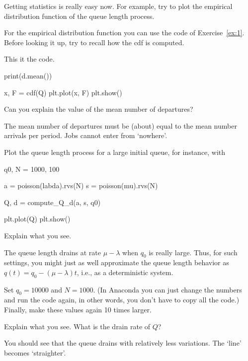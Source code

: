 \begin{exercise}
  Getting statistics is really easy now. For example,  try to plot the empirical distribution function of the queue length process.
  \begin{hint}
For  the empirical distribution function  you can use the code of Exercise~\ref{ex:1}. Before looking it up, try to recall how the cdf is computed.
  \end{hint}


  \begin{solution}
This it the code.    
  \begin{pyverbatim}
print(d.mean())
    
x, F = cdf(Q)
plt.plot(x, F)
plt.show()
  \end{pyverbatim}
  \end{solution}
\end{exercise}

\begin{exercise}
  Can you explain the value of the mean number of departures?
  \begin{solution}
    The mean number of departures must  be (about) equal  to the mean number arrivals per period. Jobs cannot enter from `nowhere'.
  \end{solution}
\end{exercise}


\begin{exercise}
Plot the queue length process for a large initial queue, for instance, with

\begin{pyverbatim}
q0, N = 1000, 100

a = poisson(labda).rvs(N)
s = poisson(mu).rvs(N)

Q, d = compute_Q_d(a, s, q0)

plt.plot(Q)
plt.show()
\end{pyverbatim}
Explain what you see.
\begin{solution}
  The queue length drains at rate $\mu-\lambda$ when $q_0$ is really large. Thus, for such settings, you might just as well approximate the queue length behavior as $q(t) = q_0 - (\mu-\lambda)t$, i.e., as a deterministic system.
\end{solution}
\end{exercise}


\begin{exercise}
Set $q_0=10000$ and $N=1000$.  (In Anaconda you can just change the numbers and run the code again, in other words, you don't have to copy all the code.) Finally,  make these values again 10 times larger. 

Explain what you see. What is the drain rate of $Q$?
\begin{solution}
  You should see that the queue drains with relatively less variations. The `line' becomes `straighter'. 
\end{solution}
\end{exercise}

